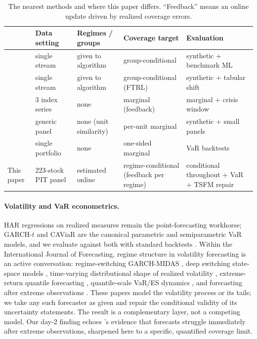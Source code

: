\begin{table}[t]
\centering
\caption{The nearest methods and where this paper differs.
``Feedback'' means an online update driven by realized coverage errors.}
\label{tab:related}
\small
\begin{tabular}{lp{2.2cm}p{2.3cm}p{2.6cm}p{2.6cm}}
\toprule
 & Data setting & Regimes / groups & Coverage target & Evaluation \\
\midrule
\citet{bharti2026parameterfree} & single stream & given to algorithm &
group-conditional & synthetic + benchmark ML \\
\citet{ramalingam2025noregret} & single stream & given to algorithm &
group-conditional (FTRL) & synthetic + tabular shift \\
\citet{aich2025temporal} & 3 index series & none &
marginal (feedback) & marginal + crisis window \\
\citet{wtqa2026panel} & generic panel & none (unit similarity) &
per-unit marginal & synthetic + small panels \\
\citet{proxyvar2026} & single portfolio & none &
one-sided marginal & VaR backtests \\
\addlinespace
This paper & 223-stock PIT panel & estimated online &
regime-conditional (feedback per regime) & conditional throughout +
VaR + TSFM repair \\
\bottomrule
\end{tabular}
\end{table}

\paragraph{Volatility and VaR econometrics.}
HAR regressions \citep{corsi2009simple} on realized measures
\citep{andersen2003modeling} remain the point-forecasting workhorse;
GARCH-$t$ \citep{bollerslev1986generalized} and CAViaR
\citep{engle2004caviar} are the canonical parametric and semiparametric
VaR models, and we evaluate against both with standard backtests
\citep{kupiec1995techniques, christoffersen1998evaluating}. Within the
International Journal of Forecasting, regime structure in volatility
forecasting is an active conversation: regime-switching GARCH-MIDAS
\citep{segnon2024forecasting}, deep switching state-space models
\citep{xu2026deep}, time-varying distributional shape of realized
volatility \citep{opschoor2023realized}, extreme-return quantile
forecasting \citep{tomlinson2024hawkes}, quantile-scale VaR/ES dynamics
\citep{liu2026quantile}, and forecasting after extreme observations
\citep{boug2026getting}. These papers model the volatility process or its
tails; we take any such forecaster as given and repair the conditional
validity of its uncertainty statements. The result is a complementary layer, not a
competing model. Our day-2 finding echoes \citet{boug2026getting}'s
evidence that forecasts struggle immediately after extreme observations,
sharpened here to a specific, quantified coverage limit.

